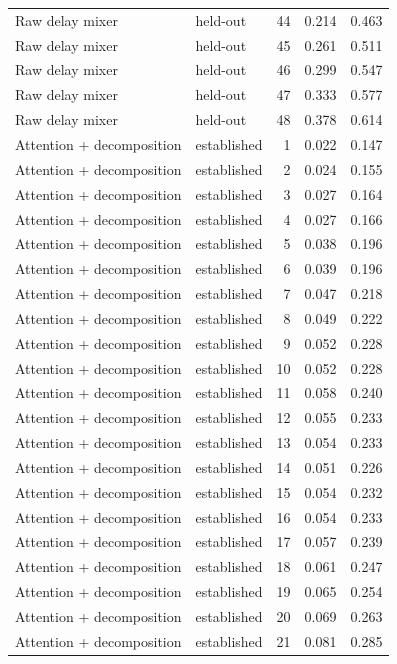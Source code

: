 \begin{tabular}{llrrr}
Raw delay mixer & held-out & 44 & 0.214 & 0.463 \\
Raw delay mixer & held-out & 45 & 0.261 & 0.511 \\
Raw delay mixer & held-out & 46 & 0.299 & 0.547 \\
Raw delay mixer & held-out & 47 & 0.333 & 0.577 \\
Raw delay mixer & held-out & 48 & 0.378 & 0.614 \\
Attention + decomposition & established & 1 & 0.022 & 0.147 \\
Attention + decomposition & established & 2 & 0.024 & 0.155 \\
Attention + decomposition & established & 3 & 0.027 & 0.164 \\
Attention + decomposition & established & 4 & 0.027 & 0.166 \\
Attention + decomposition & established & 5 & 0.038 & 0.196 \\
Attention + decomposition & established & 6 & 0.039 & 0.196 \\
Attention + decomposition & established & 7 & 0.047 & 0.218 \\
Attention + decomposition & established & 8 & 0.049 & 0.222 \\
Attention + decomposition & established & 9 & 0.052 & 0.228 \\
Attention + decomposition & established & 10 & 0.052 & 0.228 \\
Attention + decomposition & established & 11 & 0.058 & 0.240 \\
Attention + decomposition & established & 12 & 0.055 & 0.233 \\
Attention + decomposition & established & 13 & 0.054 & 0.233 \\
Attention + decomposition & established & 14 & 0.051 & 0.226 \\
Attention + decomposition & established & 15 & 0.054 & 0.232 \\
Attention + decomposition & established & 16 & 0.054 & 0.233 \\
Attention + decomposition & established & 17 & 0.057 & 0.239 \\
Attention + decomposition & established & 18 & 0.061 & 0.247 \\
Attention + decomposition & established & 19 & 0.065 & 0.254 \\
Attention + decomposition & established & 20 & 0.069 & 0.263 \\
Attention + decomposition & established & 21 & 0.081 & 0.285 \\

\end{tabular}
